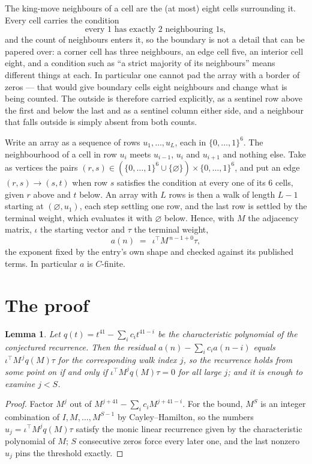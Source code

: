 \documentclass[11pt,a4paper]{article}
\theoremstyle{plain}
\newtheorem{lemma}[theorem]{Lemma}
\theoremstyle{definition}
\begin{document}
The king-move neighbours of a cell are the (at most) eight cells surrounding it. Every cell
carries the condition
\[
\text{every }1\text{ has exactly }2\text{ neighbouring }1\text{s},
\]
and the count of neighbours enters it, so the boundary is not a detail that can be papered
over: a corner cell has three neighbours, an edge cell five, an interior cell eight, and a
condition such as ``a strict majority of its neighbours'' means different things at each. In
particular one cannot pad the array with a border of zeros --- that would give boundary cells
eight neighbours and change what is being counted. The outside is therefore carried
explicitly, as a sentinel row above the first and below the last and as a sentinel column
either side, and a neighbour that falls outside is simply absent from both counts.

Write an array as a sequence of rows $u_1,\dots,u_L$, each in
$\{0,\dots,1\}^{6}$. The neighbourhood of a cell in row $u_i$ meets $u_{i-1}$,
$u_i$ and $u_{i+1}$ and nothing else. Take as vertices the pairs
$(r,s)\in(\{0,\dots,1\}^{6}\cup\{\varnothing\})\times\{0,\dots,1\}^{6}$,
and put an edge $(r,s)\to(s,t)$ when row $s$ satisfies the condition at every one of its
$6$ cells, given $r$ above and $t$ below. An array with $L$ rows is then a walk of length
$L-1$ starting at $(\varnothing,u_1)$, each step settling one row, and the last row is
settled by the terminal weight, which evaluates it with $\varnothing$ below. Hence,
with $M$ the adjacency matrix, $\iota$ the starting vector and $\tau$ the terminal weight,
\[
a(n)\;=\;\,\iota^{\!\top}M^{\,n-1+0}\tau ,
\]
the exponent fixed by the entry's own shape and checked against its published terms. In
particular $a$ is $C$-finite.

\section{The proof}

\begin{lemma}\label{lem:crit}
Let $q(t)=t^{41}-\sum_i c_it^{41-i}$ be the characteristic polynomial of the
conjectured recurrence. Then the residual $a(n)-\sum_ic_ia(n-i)$ equals
$\iota^{\!\top}M^{\,j}q(M)\tau$ for the corresponding walk index $j$, so the
recurrence holds from some point on if and only if $\iota^{\!\top}M^{j}q(M)\tau=0$ for all
large $j$; and it is enough to examine $j<S$.
\end{lemma}

\begin{proof}
Factor $M^{j}$ out of $M^{j+41}-\sum_ic_iM^{j+41-i}$. For the bound, $M^{S}$
is an integer combination of $I,M,\dots,M^{S-1}$ by Cayley--Hamilton, so the numbers
$u_j=\iota^{\!\top}M^{j}q(M)\tau$ satisfy the monic linear recurrence given by the
characteristic polynomial of $M$; $S$ consecutive zeros force every later one, and the last
nonzero $u_j$ pins the threshold exactly.
\end{proof}
\end{document}
